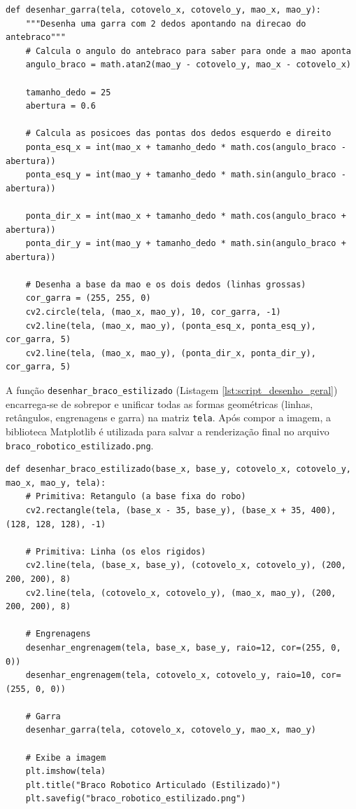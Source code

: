 \documentclass{article}
\begin{document}
\begin{lstlisting}[style=pythonstyle, caption={Função estilizada para desenho da garra do robô}, label={lst:script_garra}]
def desenhar_garra(tela, cotovelo_x, cotovelo_y, mao_x, mao_y):
    """Desenha uma garra com 2 dedos apontando na direcao do antebraco"""
    # Calcula o angulo do antebraco para saber para onde a mao aponta
    angulo_braco = math.atan2(mao_y - cotovelo_y, mao_x - cotovelo_x)
    
    tamanho_dedo = 25
    abertura = 0.6 
    
    # Calcula as posicoes das pontas dos dedos esquerdo e direito
    ponta_esq_x = int(mao_x + tamanho_dedo * math.cos(angulo_braco - abertura))
    ponta_esq_y = int(mao_y + tamanho_dedo * math.sin(angulo_braco - abertura))
    
    ponta_dir_x = int(mao_x + tamanho_dedo * math.cos(angulo_braco + abertura))
    ponta_dir_y = int(mao_y + tamanho_dedo * math.sin(angulo_braco + abertura))

    # Desenha a base da mao e os dois dedos (linhas grossas)
    cor_garra = (255, 255, 0)
    cv2.circle(tela, (mao_x, mao_y), 10, cor_garra, -1) 
    cv2.line(tela, (mao_x, mao_y), (ponta_esq_x, ponta_esq_y), cor_garra, 5) 
    cv2.line(tela, (mao_x, mao_y), (ponta_dir_x, ponta_dir_y), cor_garra, 5) 
\end{lstlisting}

A função \texttt{desenhar\_braco\_estilizado} (Listagem \ref{lst:script_desenho_geral}) encarrega-se de sobrepor e unificar todas as formas geométricas (linhas, retângulos, engrenagens e garra) na matriz \texttt{tela}. Após compor a imagem, a biblioteca Matplotlib é utilizada para salvar a renderização final no arquivo \texttt{braco\_robotico\_estilizado.png}.

\begin{lstlisting}[style=pythonstyle, caption={Função unificadora para desenhar o braço completo e exportar a imagem}, label={lst:script_desenho_geral}]
def desenhar_braco_estilizado(base_x, base_y, cotovelo_x, cotovelo_y, mao_x, mao_y, tela):
    # Primitiva: Retangulo (a base fixa do robo)
    cv2.rectangle(tela, (base_x - 35, base_y), (base_x + 35, 400), (128, 128, 128), -1)

    # Primitiva: Linha (os elos rigidos)
    cv2.line(tela, (base_x, base_y), (cotovelo_x, cotovelo_y), (200, 200, 200), 8)
    cv2.line(tela, (cotovelo_x, cotovelo_y), (mao_x, mao_y), (200, 200, 200), 8)

    # Engrenagens
    desenhar_engrenagem(tela, base_x, base_y, raio=12, cor=(255, 0, 0))
    desenhar_engrenagem(tela, cotovelo_x, cotovelo_y, raio=10, cor=(255, 0, 0))

    # Garra
    desenhar_garra(tela, cotovelo_x, cotovelo_y, mao_x, mao_y)

    # Exibe a imagem
    plt.imshow(tela)
    plt.title("Braco Robotico Articulado (Estilizado)")
    plt.savefig("braco_robotico_estilizado.png")
\end{lstlisting}
\end{document}
